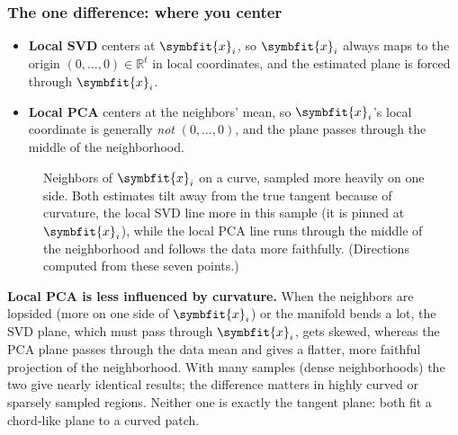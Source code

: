 \documentclass[11pt]{article}
\newcommand{\bm}[1]{\symbfit{#1}}
\newcommand{\R}{\mathbb{R}}
\newcommand{\vx}{\bm{x}}
\begin{document}
\subsubsection*{The one difference: where you center}

\begin{itemize}[nosep]
\item \textbf{Local SVD} centers at $\vx_i$, so $\vx_i$ always maps to the origin $(0,\dots,0)\in\R^t$ in local coordinates, and the
estimated plane is forced through $\vx_i$.
\item \textbf{Local PCA} centers at the neighbors' mean, so $\vx_i$'s local coordinate is generally \emph{not} $(0,\dots,0)$, and the plane passes
through the middle of the neighborhood.
\end{itemize}

\begin{figure}[htbp]
\centering
{}
\caption{Neighbors of $\vx_i$ on a curve, sampled more heavily on one side. Both estimates tilt away from the true tangent
because of curvature, the local SVD line more in this sample (it is pinned at $\vx_i$), while the local PCA line runs through the middle of
the neighborhood and follows the data more faithfully. (Directions computed from these seven points.)}
\end{figure}

\begin{careful}
\textbf{Local PCA is less influenced by curvature.} When the neighbors are lopsided (more on one side of $\vx_i$) or the
manifold bends a lot, the SVD plane, which must pass through $\vx_i$, gets skewed, whereas the PCA plane passes through the
data mean and gives a flatter, more faithful projection of the neighborhood. With many samples (dense neighborhoods) the
two give nearly identical results; the difference matters in highly curved or sparsely sampled regions. Neither one is
exactly the tangent plane: both fit a chord-like plane to a curved patch.
\end{careful}
\end{document}
